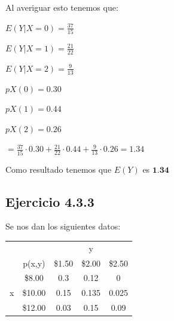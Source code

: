 \documentclass{article}\usepackage[]{graphicx}\usepackage[]{color}
\begin{document}
\begin{enumerate}
Al averiguar esto tenemos que:

\begin{center}
$E(Y|X = 0) = \frac{37}{15}$

$E(Y|X = 1) = \frac{21}{22}$

$E(Y|X = 2) = \frac{9}{13}$

$pX(0) = 0.30$

$pX(1) = 0.44$ 

$pX(2) = 0.26$

$=\frac{37}{15} \cdot 0.30 + \frac{21}{22} \cdot 0.44 + \frac{9}{13} \cdot 0.26 = 1.34$

\end{center}
Como resultado tenemos que $E(Y)$ es $\textbf{1.34}$

\end{enumerate}

\subsection{Ejercicio 4.3.3} Se nos dan los siguientes datos:
\begin{table}[h]
\centering
\begin{tabular}{cc|ccc}
&        &                           & y                         &      \\ \cline{3-5} 
& p(x,y) & \multicolumn{1}{c|}{\$1.50}  & \multicolumn{1}{c|}{\$2.00}  & \$2.50  \\ \hline
\multicolumn{1}{c|}{}  & \$8.00    & \multicolumn{1}{c|}{0.3} & \multicolumn{1}{c|}{0.12} & 0 \\ \hline
\multicolumn{1}{c|}{x} & \$10.00    & \multicolumn{1}{c|}{0.15} & \multicolumn{1}{c|}{0.135}  & 0.025  \\ \hline
\multicolumn{1}{c|}{}  & \$12.00    & \multicolumn{1}{c|}{0.03} & \multicolumn{1}{c|}{0.15}  & 0.09
\end{tabular}
\end{table}
\end{document}
